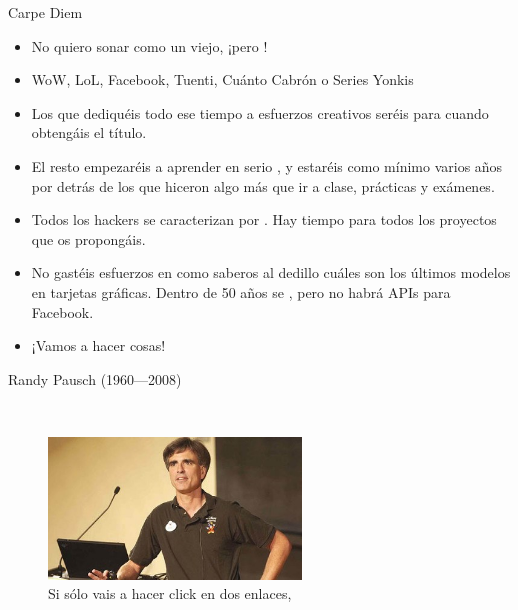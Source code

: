 \documentclass[14pt]{beamer}
\newcommand{\WebLink}[2]{
  \href{#1}{\structure{\PointingHand~\color{sail-green}{#2}}}
}
\begin{document}
\begin{frame}{Carpe Diem}
  \begin{itemize}
    \item No quiero sonar como un viejo, ¡pero !
    \item WoW, LoL, Facebook, Tuenti, Cuánto Cabrón o Series Yonkis
    \item Los que dediquéis todo ese tiempo a esfuerzos creativos
      seréis  para
      cuando obtengáis el título.
    \item El resto empezaréis a aprender en serio , y estaréis como mínimo varios años por detrás de los
      que hiceron algo más que ir a clase, prácticas y exámenes.
    \item Todos los hackers se caracterizan por . Hay tiempo para todos los proyectos que os
      propongáis.
    \item No gastéis esfuerzos en 
      como saberos al dedillo cuáles son los últimos modelos en
      tarjetas gráficas. Dentro de 50 años se , pero no habrá APIs para Facebook.
    \item ¡Vamos a hacer cosas!
  \end{itemize}
\end{frame}

\begin{frame}{Randy Pausch (1960---2008)}

  \begin{center}
    \WebLink{https://www.youtube.com/watch?v=ji5_MqicxSo}
            {The Last Lecture: Achieving Your Childhood Dreams}

            \CrossedBox \\
    \WebLink{https://www.youtube.com/watch?v=oTugjssqOT0}
            {Time Management}
  \end{center}

  \begin{figure}
    \centering
    \includegraphics[width=0.6\textwidth]{pics/randy-pausch.jpg}
    \caption*{\small Si sólo vais a hacer click en dos enlaces, }
  \end{figure}

\end{frame}
\end{document}
